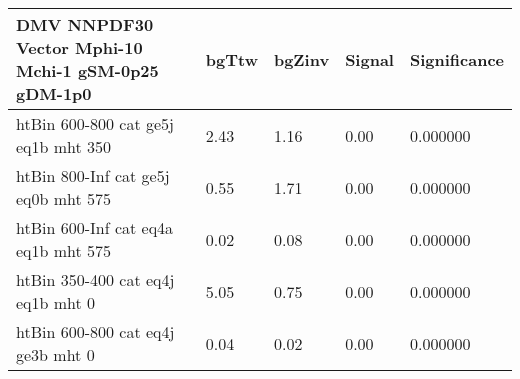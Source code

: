  \begin{tabular}{|l|l|l|l|l|}
\small
   \label{mostSensitiveBins_DMV_NNPDF30_Vector_Mphi-10_Mchi-1_gSM-0p25_gDM-1p0_25ns}
	\textbf{DMV NNPDF30 Vector Mphi-10 Mchi-1 gSM-0p25 gDM-1p0}	 & 	bgTtw	 & 	bgZinv	 & 	Signal &	 Significance \\ 
	\hline
	htBin 600-800 cat ge5j eq1b mht 350 & 	2.43	 & 	1.16	 & 	0.00 	&0.000000 \\ 
	htBin 800-Inf cat ge5j eq0b mht 575 & 	0.55	 & 	1.71	 & 	0.00 	&0.000000 \\ 
	htBin 600-Inf cat eq4a eq1b mht 575 & 	0.02	 & 	0.08	 & 	0.00 	&0.000000 \\ 
	htBin 350-400 cat eq4j eq1b mht 0 & 	5.05	 & 	0.75	 & 	0.00 	&0.000000 \\ 
	htBin 600-800 cat eq4j ge3b mht 0 & 	0.04	 & 	0.02	 & 	0.00 	&0.000000 \\ 
\end{tabular}
